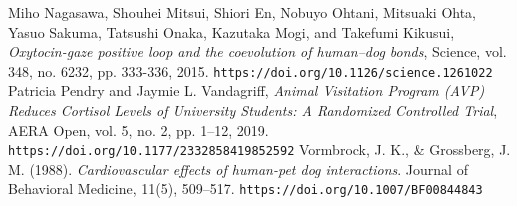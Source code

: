 \documentclass[a4j]{ltjsarticle}
\begin{document}
\small
\begin{thebibliography}{9}
 Miho Nagasawa, Shouhei Mitsui, Shiori En, Nobuyo Ohtani, Mitsuaki Ohta, Yasuo Sakuma, Tatsushi Onaka, Kazutaka Mogi, and Takefumi Kikusui, 
\textit{Oxytocin-gaze positive loop and the coevolution of human–dog bonds}, 
Science, vol. 348, no. 6232, pp. 333-336, 2015.
\texttt{https://doi.org/10.1126/science.1261022}
 Patricia Pendry and Jaymie L. Vandagriff, 
\textit{Animal Visitation Program (AVP) Reduces Cortisol Levels of University Students: A Randomized Controlled Trial}, 
AERA Open, vol. 5, no. 2, pp. 1–12, 2019.
\texttt{https://doi.org/10.1177/2332858419852592}
Vormbrock, J. K., \& Grossberg, J. M. (1988).
\textit{Cardiovascular effects of human-pet dog interactions}.
Journal of Behavioral Medicine, 11(5), 509–517.
\texttt{https://doi.org/10.1007/BF00844843}

\end{thebibliography}
\end{document}
